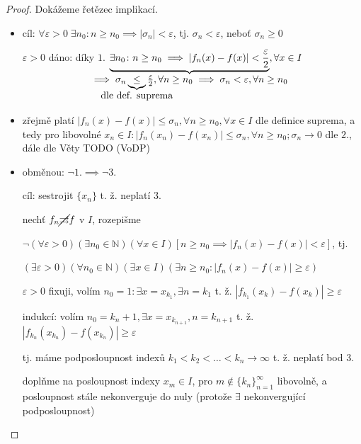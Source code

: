 \begin{proof}
  Dokážeme řetězec implikací.
  \begin{itemize}
    \item[$1. \implies 2.$] cíl: $\forall \varepsilon >0\; \exists n_0\colon n \geq n_0 \implies |\sigma_n| < \varepsilon$, tj. $\sigma_n < \varepsilon$, neboť $\sigma_n \geq 0$

    $\varepsilon >0$ dáno: díky $1.$ $\underbrace{\exists n_0\colon n \geq n_0 \implies |f_n(x)-f(x)|<\frac{\varepsilon}{2}}_{\textstyle \mathclap{\implies \sigma_n \underbrace{\leq}_{\textstyle \mathclap{\text{dle def. suprema}}} \frac{\varepsilon}{2}, \forall n \geq n_0 \implies \sigma_n < \varepsilon, \forall n \geq n_0}}, \forall x \in I$

    \item[$2. \implies 3.$] zřejmě platí $|f_n(x) -f(x)|\leq \sigma_n, \forall n \geq n_0, \forall x \in I$ dle definice suprema, a tedy pro libovolné $x_n \in I \colon |f_n(x_n)-f(x_n)|\leq \sigma_n, \forall n \geq n_0; \sigma_n \to 0$ dle $2.$, dále dle Věty TODO (VoDP)

    \item[$2. \implies 3.$] obměnou: $\neg 1. \implies \neg 3.$

    cíl: sestrojit $\{x_n\}$ t. ž. neplatí $3.$

    nechť $f_n \cancel{\operatorname{\rightrightarrows}} f$ v $I$, rozepišme

    $\neg (\forall \varepsilon > 0)(\exists n_0 \in \mathbb N)(\forall x \in I)[n \geq n_0 \implies |f_n(x)-f(x)|<\varepsilon]$, tj.

    $(\exists \varepsilon >0)(\forall n_0 \in \mathbb N)(\exists x \in I)(\exists n \geq n_0\colon |f_n(x)-f(x)|\geq \varepsilon)$

    $\varepsilon > 0$ fixuji, volím $n_0 = 1\colon \exists x = x_{k_1}, \exists n = k_1$ t. ž. $|f_{k_1}(x_k)-f(x_k)|\geq \varepsilon$

    indukcí: volím $n_0 = k_n + 1, \exists x = x_{k_{n+1}}, n = k_{n+1}$ t. ž. $|f_{k_n}(x_{k_n})-f(x_{k_n})|\geq \varepsilon$

    tj. máme podposloupnost indexů $k_1 < k_2 < \dots < k_n \to \infty$ t. ž. neplatí bod $3.$

    doplňme na posloupnost indexy $x_m \in I$, pro $m \notin \{k_n\}_{n=1}^{\infty}$ libovolně, a posloupnost stále nekonverguje do nuly (protože $\exists$ nekonvergující podposloupnost)
  \end{itemize}
\end{proof}

